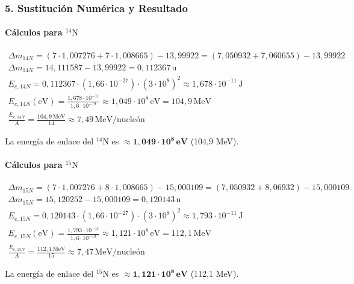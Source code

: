 \subsubsection*{5. Sustitución Numérica y Resultado}
\paragraph*{Cálculos para ${}^{14}\text{N}$}
\begin{gather}
    \Delta m_{14N} = (7 \cdot 1,007276 + 7 \cdot 1,008665) - 13,99922 = (7,050932 + 7,060655) - 13,99922 \\
    \Delta m_{14N} = 14,111587 - 13,99922 = 0,112367 \, \text{u} \\
    E_{e, 14N} = 0,112367 \cdot (1,66\cdot10^{-27}) \cdot (3\cdot10^8)^2 \approx 1,678 \cdot 10^{-11} \, \text{J} \\
    E_{e, 14N} (\text{eV}) = \frac{1,678 \cdot 10^{-11}}{1,6 \cdot 10^{-19}} \approx 1,049 \cdot 10^8 \, \text{eV} = 104,9 \, \text{MeV} \\
    \frac{E_{e, 14N}}{A} = \frac{104,9 \, \text{MeV}}{14} \approx 7,49 \, \text{MeV/nucleón}
\end{gather}
\begin{cajaresultado}
    La energía de enlace del ${}^{14}\text{N}$ es $\boldsymbol{\approx 1,049 \cdot 10^8 \, \textbf{eV}}$ (104,9 MeV).
\end{cajaresultado}

\paragraph*{Cálculos para ${}^{15}\text{N}$}
\begin{gather}
    \Delta m_{15N} = (7 \cdot 1,007276 + 8 \cdot 1,008665) - 15,000109 = (7,050932 + 8,06932) - 15,000109 \\
    \Delta m_{15N} = 15,120252 - 15,000109 = 0,120143 \, \text{u} \\
    E_{e, 15N} = 0,120143 \cdot (1,66\cdot10^{-27}) \cdot (3\cdot10^8)^2 \approx 1,793 \cdot 10^{-11} \, \text{J} \\
    E_{e, 15N} (\text{eV}) = \frac{1,793 \cdot 10^{-11}}{1,6 \cdot 10^{-19}} \approx 1,121 \cdot 10^8 \, \text{eV} = 112,1 \, \text{MeV} \\
    \frac{E_{e, 15N}}{A} = \frac{112,1 \, \text{MeV}}{15} \approx 7,47 \, \text{MeV/nucleón}
\end{gather}
\begin{cajaresultado}
    La energía de enlace del ${}^{15}\text{N}$ es $\boldsymbol{\approx 1,121 \cdot 10^8 \, \textbf{eV}}$ (112,1 MeV).
\end{cajaresultado}

